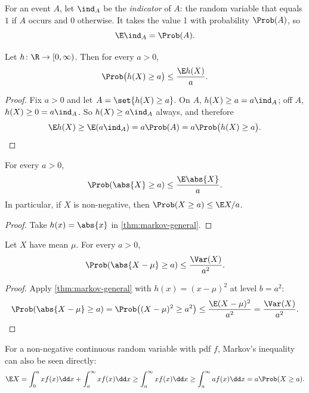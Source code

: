 For an event $A$, let $\ind_A$ be the \emph{indicator} of $A$: the random variable that equals $1$ if $A$ occurs and $0$ otherwise. It takes the value 1 with probability $\Prob(A)$, so
\[
  \E \ind_A = \Prob(A).
\]

\begin{theorem}\label{thm:markov-general}
Let $h \colon \R \to [0, \infty)$. Then for every $a > 0$,
\[
  \Prob\bigl(h(X) \ge a\bigr) \le \frac{\E h(X)}{a}.
\]
\end{theorem}

\begin{proof}
Fix $a > 0$ and let $A = \set{h(X) \ge a}$. On $A$, $h(X) \ge a = a \ind_A$; off $A$, $h(X) \ge 0 = a \ind_A$. So $h(X) \ge a \ind_A$ always, and therefore
\[
  \E h(X) \ge \E(a \ind_A) = a \Prob(A) = a \Prob\bigl(h(X) \ge a\bigr). \qedhere
\]
\end{proof}

\begin{corollary}\label{cor:markov}
For every $a > 0$,
\[
  \Prob(\abs{X} \ge a) \le \frac{\E\abs{X}}{a}.
\]
In particular, if $X$ is non-negative, then $\Prob(X \ge a) \le \E X / a$.
\end{corollary}

\begin{proof}
Take $h(x) = \abs{x}$ in \cref{thm:markov-general}.
\end{proof}

\begin{corollary}\label{cor:chebyshev}
Let $X$ have mean $\mu$. For every $a > 0$,
\[
  \Prob(\abs{X - \mu} \ge a) \le \frac{\Var(X)}{a^2}.
\]
\end{corollary}

\begin{proof}
Apply \cref{thm:markov-general} with $h(x) = (x - \mu)^2$ at level $b = a^2$:
\[
  \Prob(\abs{X - \mu} \ge a) = \Prob\bigl((X - \mu)^2 \ge a^2\bigr) \le \frac{\E(X - \mu)^2}{a^2} = \frac{\Var(X)}{a^2}. \qedhere
\]
\end{proof}

\begin{remark}
For a non-negative continuous random variable with pdf $f$, Markov's inequality can also be seen directly:
\[
  \E X = \int_0^a x f(x) \dd x + \int_a^\infty x f(x) \dd x \ge \int_a^\infty x f(x) \dd x \ge \int_a^\infty a f(x) \dd x = a \Prob(X \ge a).
\]
\end{remark}
